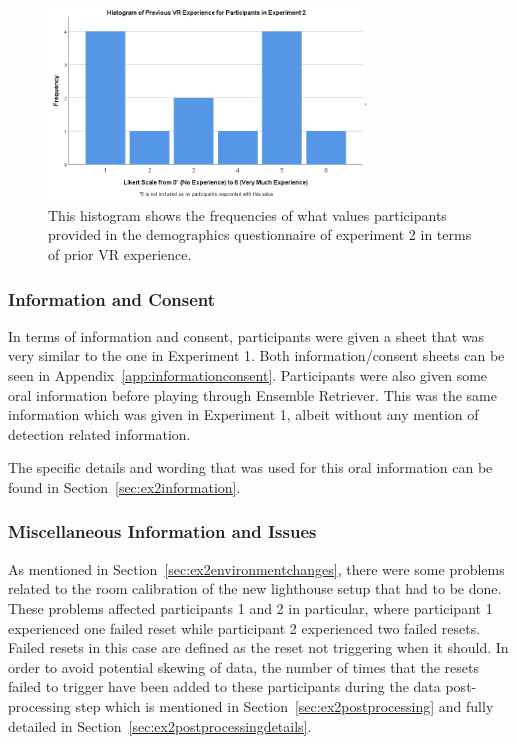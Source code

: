 \begin{figure}[tbph]
    \centering
    \includegraphics[width=0.75\textwidth]{figures/graphs/PriorVRExperienceExperiment2.png}
    \caption[Histogram on Prior VR Experience of Participants in Experiment 2]{This histogram shows the frequencies of what values participants provided in the demographics questionnaire of experiment 2 in terms of prior VR experience.}
    \label{fig:ex2PriorVRExperience}
\end{figure}

\subsubsection{Information and Consent}
In terms of information and consent, participants were given a sheet that was very similar to the one in Experiment 1. Both information/consent sheets can be seen in Appendix~\ref{app:informationconsent}. Participants were also given some oral information before playing through Ensemble Retriever. This was the same information which was given in Experiment 1, albeit without any mention of detection related information. 

The specific details and wording that was used for this oral information can be found in Section~\ref{sec:ex2information}.

\subsubsection{Miscellaneous Information and Issues}
As mentioned in Section~\ref{sec:ex2environmentchanges}, there were some problems related to the room calibration of the new lighthouse setup that had to be done. These problems affected participants 1 and 2 in particular, where participant 1 experienced one failed reset while participant 2 experienced two failed resets. Failed resets in this case are defined as the reset not triggering when it should. In order to avoid potential skewing of data, the number of times that the resets failed to trigger have been added to these participants during the data post-processing step which is mentioned in Section~\ref{sec:ex2postprocessing} and fully detailed in Section~\ref{sec:ex2postprocessingdetails}. 

